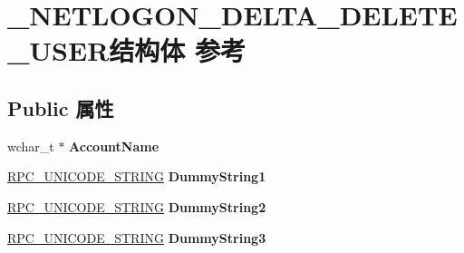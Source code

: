 \hypertarget{struct___n_e_t_l_o_g_o_n___d_e_l_t_a___d_e_l_e_t_e___u_s_e_r}{}\section{\+\_\+\+N\+E\+T\+L\+O\+G\+O\+N\+\_\+\+D\+E\+L\+T\+A\+\_\+\+D\+E\+L\+E\+T\+E\+\_\+\+U\+S\+E\+R结构体 参考}
\label{struct___n_e_t_l_o_g_o_n___d_e_l_t_a___d_e_l_e_t_e___u_s_e_r}
\subsection*{Public 属性}
\begin{DoxyCompactItemize}
\item 
\mbox{\label{struct___n_e_t_l_o_g_o_n___d_e_l_t_a___d_e_l_e_t_e___u_s_e_r_a3b935ff55bf595d154812f27dc9e8cc6}} 
wchar\+\_\+t $\ast$ {\bfseries Account\+Name}
\item 
\mbox{\label{struct___n_e_t_l_o_g_o_n___d_e_l_t_a___d_e_l_e_t_e___u_s_e_r_a909c15af8f251f03f0a6bf8d327a7cb7}} 
\hyperlink{struct___r_p_c___u_n_i_c_o_d_e___s_t_r_i_n_g}{R\+P\+C\+\_\+\+U\+N\+I\+C\+O\+D\+E\+\_\+\+S\+T\+R\+I\+NG} {\bfseries Dummy\+String1}
\item 
\mbox{\label{struct___n_e_t_l_o_g_o_n___d_e_l_t_a___d_e_l_e_t_e___u_s_e_r_a8f30784c5a313d8c24a69cb8496e2f68}} 
\hyperlink{struct___r_p_c___u_n_i_c_o_d_e___s_t_r_i_n_g}{R\+P\+C\+\_\+\+U\+N\+I\+C\+O\+D\+E\+\_\+\+S\+T\+R\+I\+NG} {\bfseries Dummy\+String2}
\item 
\mbox{\label{struct___n_e_t_l_o_g_o_n___d_e_l_t_a___d_e_l_e_t_e___u_s_e_r_aa7a04b58e06c824194be56db3022e332}} 
\hyperlink{struct___r_p_c___u_n_i_c_o_d_e___s_t_r_i_n_g}{R\+P\+C\+\_\+\+U\+N\+I\+C\+O\+D\+E\+\_\+\+S\+T\+R\+I\+NG} {\bfseries Dummy\+String3}
\item 
\mbox{\label{struct___n_e_t_l_o_g_o_n___d_e_l_t_a___d_e_l_e_t_e___u_s_e_r_a6ad79bdf2bda2d1f69842c00eea0483a}} 

\end{DoxyCompactItemize}
